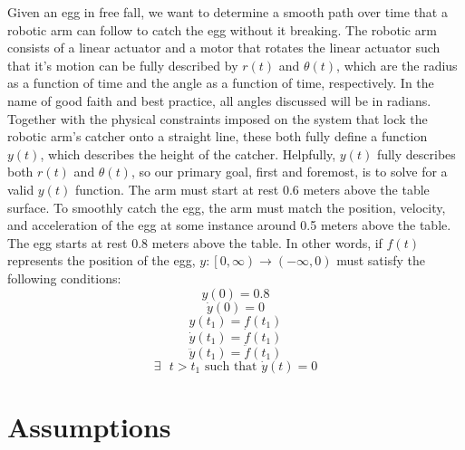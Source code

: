 \documentclass[nofoot,pdf-a,balance,colorlinks,upint,subscriptcorrection,varvw,mathalfa=cal=boondoxo]{asmeconf}
\begin{document}
    Given an egg in free fall, we want to determine a smooth path over time that a robotic arm can follow to catch the egg without it breaking. The robotic arm consists of a linear actuator and a motor that rotates the linear actuator such that it's motion can be fully described by $r\left(t\right)$ and $\theta\left(t\right)$, which are the radius as a function of time and the angle as a function of time, respectively. In the name of good faith and best practice, all angles discussed will be in radians. Together with the physical constraints imposed on the system that lock the robotic arm's catcher onto a straight line, these both fully define a function $y\left(t\right)$, which describes the height of the catcher. Helpfully, $y\left(t\right)$ fully describes both $r\left(t\right)$ and $\theta\left(t\right)$, so our primary goal, first and foremost, is to solve for a valid $y\left(t\right)$ function. The arm must start at rest 0.6 meters above the table surface. To smoothly catch the egg, the arm must match the position, velocity, and acceleration of the egg at some instance around 0.5 meters above the table. The egg starts at rest 0.8 meters above the table.\newline \newline 
    In other words, if $f\left(t\right)$ represents the position of the egg, $y:\left[0, \infty\right) \to \left(-\infty, 0\right)
$ must satisfy the following conditions:
    \begin{equation}
        y\left(0\right) = 0.8
    \end{equation}
    \begin{equation}
        \dot{y}\left(0\right) = 0
    \end{equation}
    \begin{equation}
        {y}\left(t_1\right) = f\left(t_1\right)
    \end{equation}
    \begin{equation}
        \dot{y}\left(t_1\right) = \dot{f}\left(t_1\right)
    \end{equation}
    \begin{equation}
        \ddot{y}\left(t_1\right) = \ddot{f}\left(t_1\right)
    \end{equation}
    \begin{equation}
        \exists \textrm{ }t > t_1 \textrm{      such that  } \dot{y}\left(t\right) = 0 
    \end{equation}
	
		\section*{Assumptions}
	
\end{document}
